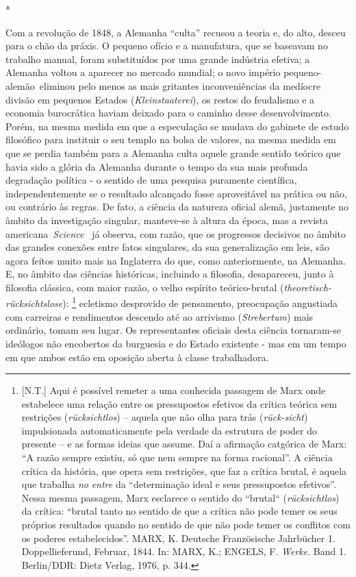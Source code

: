 *

Com a revolução de 1848, a Alemanha ``culta'' recusou a teoria e, do
alto, desceu para o chão da práxis. O pequeno ofício e a manufatura, que
se baseavam no trabalho manual, foram substituídos por uma grande
indústria efetiva; a Alemanha voltou a aparecer no mercado mundial; o
novo império pequeno-alemão\protect\hypertarget{r38}{}{}~eliminou pelo
menos as mais gritantes inconveniências da medíocre divisão em pequenos
Estados (\emph{Kleinstaaterei})\protect\hypertarget{r39}{}{}, os restos
do feudalismo e a economia burocrática haviam deixado para o caminho
desse desenvolvimento. Porém, na mesma medida em que a especulação se
mudava do gabinete de estudo filosófico para instituir o seu templo na
bolsa de valores, na mesma medida em que se perdia também para a
Alemanha culta aquele grande sentido teórico que havia sido a glória da
Alemanha durante o tempo da sua mais profunda degradação política - o
sentido de uma pesquisa puramente científica, independentemente se o
resultado alcançado fosse aproveitável na prática ou não, ou contrário
às regras. De fato, a ciência da natureza oficial alemã, justamente no
âmbito da investigação singular, manteve-se à altura da época, mas a
revista americana~\emph{Science~} já observa, com razão, que os
progressos decisivos no âmbito das grandes conexões entre fatos
singulares, da sua generalização em leis, são agora feitos muito mais na
Inglaterra do que, como anteriormente, na Alemanha. E, no âmbito das
ciências históricas, incluindo a filosofia, desapareceu, junto à
filosofia clássica, com maior razão, o velho espírito teórico-brutal
(\emph{theoretisch-rücksichtslose}): \footnote{{[}N.T.{]} Aqui é
  possível remeter a uma conhecida passagem de Marx onde estabelece uma
  relação entre os pressupostos efetivos da crítica teórica sem
  restrições (\emph{rücksichtlos}) -- aquela que não olha para trás
  (\emph{rück-sicht}) impulsionada automaticamente pela verdade da
  estrutura de poder do presente -- e as formas ideias que assume. Daí a
  afirmação catgórica de Marx: ``A razão sempre existiu, só que nem
  sempre na forma racional''. A ciência crítica da história, que opera
  sem restrições, que faz a crítica brutal, é aquela que trabalha
  \emph{no} \emph{entre} da ``determinação ideal e seus pressupostos
  efetivos''. Nessa mesma passagem, Marx esclarece o sentido do
  ``brutal`` (\emph{rücksichtlos}) da crítica: ``brutal tanto no sentido
  de que a crítica não pode temer os seus próprios resultados quando no
  sentido de que não pode temer os conflitos com os poderes
  estabelecidos''. MARX, K. Deutsche Französische Jahrbücher 1.
  Doppellieferund, Februar, 1844. In: MARX, K.; ENGELS, F. \emph{Werke}.
  Band 1. Berlin/DDR: Dietz Verlag, 1976, p. 344.} ecletismo desprovido
de pensamento, preocupação angustiada com carreiras e rendimentos
descendo até ao arrivismo (\emph{Strebertum}) mais ordinário, tomam seu
lugar. Os representantes oficiais desta ciência tornaram-se ideólogos
não encobertos da burguesia e do Estado existente - mas em um tempo em
que ambos estão em oposição aberta à classe trabalhadora.

